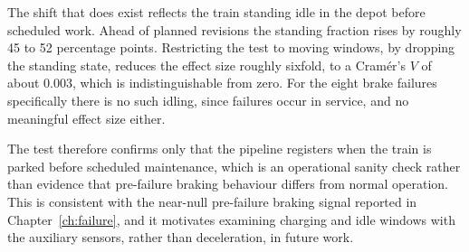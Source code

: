 The shift that does exist reflects the train standing idle in the depot before scheduled work.
Ahead of planned revisions the standing fraction rises by roughly 45 to 52 percentage points.
Restricting the test to moving windows, by dropping the standing state, reduces the effect
size roughly sixfold, to a Cramér's $V$ of about 0.003, which is indistinguishable from zero.
For the eight brake failures specifically there is no such idling, since failures occur in
service, and no meaningful effect size either.

The test therefore confirms only that the pipeline registers when the train is parked before
scheduled maintenance, which is an operational sanity check rather than evidence that
pre-failure braking behaviour differs from normal operation. This is consistent with the
near-null pre-failure braking signal reported in Chapter~\ref{ch:failure}, and it motivates
examining charging and idle windows with the auxiliary sensors, rather than deceleration, in
future work.